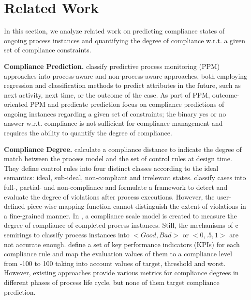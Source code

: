 \section{Related Work}
\label{sec:rel_work} 

In this section, we analyze related work on predicting compliance states of ongoing process instances and quantifying the degree of compliance w.r.t. a given set of compliance constraints.

\noindent\textbf{Compliance Prediction.} \cite{DBLP:journals/tsc/Marquez-Chamorro18} classify predictive process monitoring (PPM) approaches into process-aware and non-process-aware approaches, both employing regression and classification methods to predict attributes in the future, such as next activity, next time, or the outcome of the case. As part of PPM, outcome-oriented PPM \cite{DBLP:journals/tkdd/TeinemaaDRM19,DBLP:conf/bpm/TeinemaaDMF16} and predicate prediction \cite{DBLP:conf/caise/MaggiFDG14,DBLP:journals/tsc/Francescomarino19} focus on compliance predictions of ongoing instances regarding a given set of constraints; the binary yes or no answer w.r.t. compliance is not sufficient for compliance management and requires the ability to quantify the degree of compliance.

\noindent\textbf{Compliance Degree.} \cite{DBLP:journals/ism/LuSG08} calculate a compliance distance to indicate the degree of match between the process model and the set of control rules at design time. They define control rules into four distinct classes according to the ideal semantics: ideal, sub-ideal, non-compliant and irrelevant states.
\cite{DBLP:conf/aicol/LamHK20} classify cases into full-, partial- and non-compliance and formulate a framework to detect and evaluate the degree of violations after process executions. However, the user-defined piece-wise mapping function cannot distinguish the extent of violations in a fine-grained manner. In \cite{DBLP:conf/edoc/MorrisonGK09}, a compliance scale model is created to measure the degree of compliance of completed process instances. Still, the mechanisms of c-semirings to classify process instances into $<Good, Bad>$ or $<0, .5, 1>$ are not accurate enough. \cite{Shamsaei2011IndicatorbasedPC} define a set of key performance indicators (KPIs) for each compliance rule and map the evaluation values of them to a compliance level from -100 to 100 taking into account values of target, threshold and worst. However, existing approaches provide various metrics for compliance degrees in different phases of process life cycle, but none of them target compliance prediction.